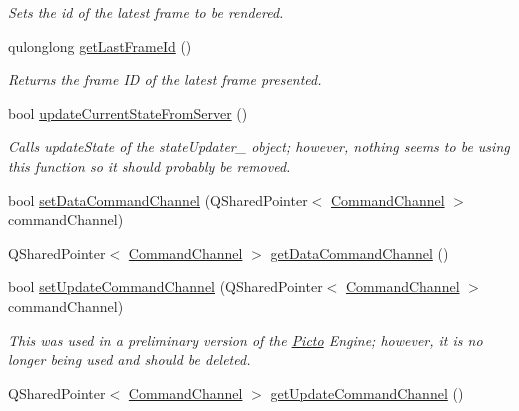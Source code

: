 \begin{DoxyCompactItemize}
\begin{DoxyCompactList}\small\item\em Sets the id of the latest frame to be rendered. \end{DoxyCompactList}\item 
\hypertarget{class_picto_1_1_engine_1_1_picto_engine_a2ba9f60ef40d84fd4bfd375aa23e37dc}{qulonglong \hyperlink{class_picto_1_1_engine_1_1_picto_engine_a2ba9f60ef40d84fd4bfd375aa23e37dc}{get\-Last\-Frame\-Id} ()}\label{class_picto_1_1_engine_1_1_picto_engine_a2ba9f60ef40d84fd4bfd375aa23e37dc}

\begin{DoxyCompactList}\small\item\em Returns the frame I\-D of the latest frame presented. \end{DoxyCompactList}\item 
\hypertarget{class_picto_1_1_engine_1_1_picto_engine_aed9f5c3dc94e5fe80fe84fbdd0462a1a}{bool \hyperlink{class_picto_1_1_engine_1_1_picto_engine_aed9f5c3dc94e5fe80fe84fbdd0462a1a}{update\-Current\-State\-From\-Server} ()}\label{class_picto_1_1_engine_1_1_picto_engine_aed9f5c3dc94e5fe80fe84fbdd0462a1a}

\begin{DoxyCompactList}\small\item\em Calls update\-State of the state\-Updater\-\_\- object; however, nothing seems to be using this function so it should probably be removed. \end{DoxyCompactList}\item 
bool \hyperlink{class_picto_1_1_engine_1_1_picto_engine_ae17b60511ce23fb20cd45e0d0d339698}{set\-Data\-Command\-Channel} (Q\-Shared\-Pointer$<$ \hyperlink{class_picto_1_1_command_channel}{Command\-Channel} $>$ command\-Channel)
\item 
Q\-Shared\-Pointer$<$ \hyperlink{class_picto_1_1_command_channel}{Command\-Channel} $>$ \hyperlink{class_picto_1_1_engine_1_1_picto_engine_ab0b3d1e9a848e3e1238522f50c79880e}{get\-Data\-Command\-Channel} ()
\item 
bool \hyperlink{class_picto_1_1_engine_1_1_picto_engine_a4e63c79b62310facb7b3c40e1952f37f}{set\-Update\-Command\-Channel} (Q\-Shared\-Pointer$<$ \hyperlink{class_picto_1_1_command_channel}{Command\-Channel} $>$ command\-Channel)
\begin{DoxyCompactList}\small\item\em This was used in a preliminary version of the \hyperlink{namespace_picto}{Picto} Engine; however, it is no longer being used and should be deleted. \end{DoxyCompactList}\item 
\hypertarget{class_picto_1_1_engine_1_1_picto_engine_a42a6699f918ec3848be4abaf9178bd5b}{Q\-Shared\-Pointer$<$ \hyperlink{class_picto_1_1_command_channel}{Command\-Channel} $>$ \hyperlink{class_picto_1_1_engine_1_1_picto_engine_a42a6699f918ec3848be4abaf9178bd5b}{get\-Update\-Command\-Channel} ()}\label{class_picto_1_1_engine_1_1_picto_engine_a42a6699f918ec3848be4abaf9178bd5b}


\end{DoxyCompactItemize}

